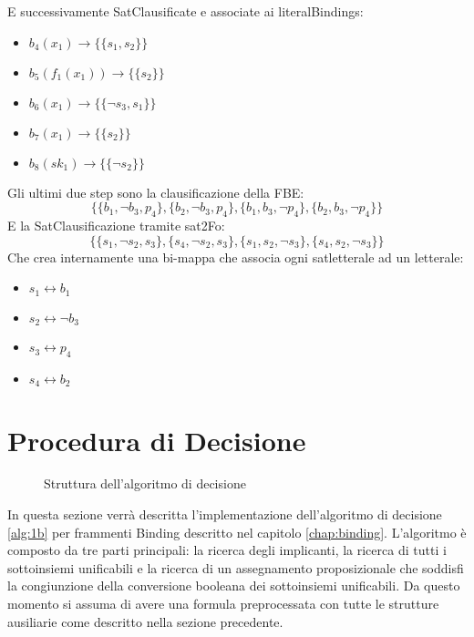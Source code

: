\documentclass[./main.tex]{subfiles}
\begin{document}
E successivamente SatClausificate e associate ai literalBindings:
\begin{itemize}
    \item $b_4(x_1) \rightarrow \{\{s_1, s_2\}\}$
    \item $b_5(f_1(x_1)) \rightarrow \{\{s_2\}\}$
    \item $b_6(x_1) \rightarrow \{\{\lnot s_3, s_1\}\}$
    \item $b_7(x_1) \rightarrow \{\{s_2\}\}$
    \item $b_8(sk_1) \rightarrow \{\{\lnot s_2\}\}$
\end{itemize}

Gli ultimi due step sono la clausificazione della FBE:
$$ \{\{b_1, \lnot b_3, p_4\}, \{b_2, \lnot b_3, p_4\}, \{b_1, b_3, \lnot p_4\}, \{b_2,  b_3, \lnot p_4\}\} $$
E la SatClausificazione tramite sat2Fo:
$$ \{\{s_1, \lnot s_2, s_3\}, \{s_4, \lnot s_2, s_3\}, \{s_1, s_2, \lnot s_3\}, \{s_4,  s_2, \lnot s_3\}\} $$
Che crea internamente una bi-mappa che associa ogni satletterale ad un letterale:
\begin{multicols}{2}
\begin{itemize}
    \item $s_1 \leftrightarrow b_1$
    \item $s_2 \leftrightarrow \lnot b_3$
    \item $s_3 \leftrightarrow p_4$
    \item $s_4 \leftrightarrow b_2$
\end{itemize} 
\end{multicols}



\section{Procedura di Decisione} \label{sec:decisione}
\begin{figure}[H]
    \centering
    \scalebox{0.55}{
        
    }
    \caption{Struttura dell'algoritmo di decisione}
    \label{fig:algoritmo_decisione}
\end{figure}

In questa sezione verrà descritta l'implementazione dell'algoritmo di decisione \ref{alg:1b}
per frammenti Binding descritto nel capitolo \ref{chap:binding}.
L'algoritmo è composto da tre parti principali: la ricerca degli implicanti,
la ricerca di tutti i sottoinsiemi unificabili e la ricerca di un assegnamento proposizionale 
che soddisfi la congiunzione della conversione booleana dei sottoinsiemi unificabili.
Da questo momento si assuma di avere una formula preprocessata con tutte le strutture ausiliarie come descritto nella sezione precedente.
\end{document}
